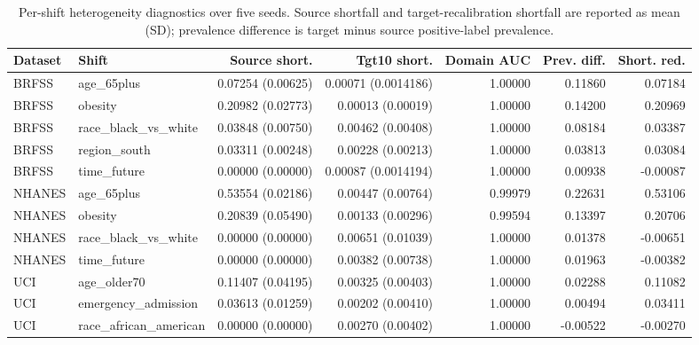 \begin{table}[!tbp]
\centering
\caption{Per-shift heterogeneity diagnostics over five seeds. Source shortfall and target-recalibration shortfall are reported as mean (SD); prevalence difference is target minus source positive-label prevalence.}
\label{primary-tab:heterogeneity_diagnostics}
\scriptsize
\setlength{\tabcolsep}{3pt}
\begin{adjustbox}{max width=\textwidth}
\begin{tabular}{llrrrrr}
\toprule
Dataset & Shift & Source short. & Tgt10 short. & Domain AUC & Prev. diff. & Short. red. \\
\midrule
BRFSS & age\_65plus & 0.07254 (0.00625) & 0.00071 (0.0014186) & 1.00000 & 0.11860 & 0.07184 \\
BRFSS & obesity & 0.20982 (0.02773) & 0.00013 (0.00019) & 1.00000 & 0.14200 & 0.20969 \\
BRFSS & race\_black\_vs\_white & 0.03848 (0.00750) & 0.00462 (0.00408) & 1.00000 & 0.08184 & 0.03387 \\
BRFSS & region\_south & 0.03311 (0.00248) & 0.00228 (0.00213) & 1.00000 & 0.03813 & 0.03084 \\
BRFSS & time\_future & 0.00000 (0.00000) & 0.00087 (0.0014194) & 1.00000 & 0.00938 & -0.00087 \\
NHANES & age\_65plus & 0.53554 (0.02186) & 0.00447 (0.00764) & 0.99979 & 0.22631 & 0.53106 \\
NHANES & obesity & 0.20839 (0.05490) & 0.00133 (0.00296) & 0.99594 & 0.13397 & 0.20706 \\
NHANES & race\_black\_vs\_white & 0.00000 (0.00000) & 0.00651 (0.01039) & 1.00000 & 0.01378 & -0.00651 \\
NHANES & time\_future & 0.00000 (0.00000) & 0.00382 (0.00738) & 1.00000 & 0.01963 & -0.00382 \\
UCI & age\_older70 & 0.11407 (0.04195) & 0.00325 (0.00403) & 1.00000 & 0.02288 & 0.11082 \\
UCI & emergency\_admission & 0.03613 (0.01259) & 0.00202 (0.00410) & 1.00000 & 0.00494 & 0.03411 \\
UCI & race\_african\_american & 0.00000 (0.00000) & 0.00270 (0.00402) & 1.00000 & -0.00522 & -0.00270 \\
\bottomrule
\end{tabular}
\end{adjustbox}
\end{table}
